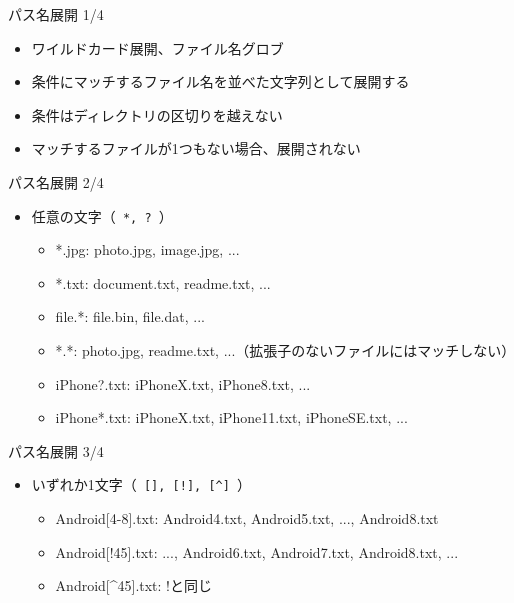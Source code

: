 \documentclass[12pt,aspectratio=169]{beamer}
\begin{document}
\begin{frame}{パス名展開 1/4}

  \begin{itemize}
    \item ワイルドカード展開、ファイル名グロブ
    \item 条件にマッチするファイル名を並べた文字列として展開する
    \item 条件はディレクトリの区切りを越えない
    \item マッチするファイルが1つもない場合、展開されない

  \end{itemize}

\end{frame}


\begin{frame}{パス名展開 2/4}

  \begin{itemize}
    \item 任意の文字（\texttt{ *, ? }）
      \begin{itemize}
        \item *.jpg: photo.jpg, image.jpg, ...
        \item *.txt: document.txt, readme.txt, ...
        \item file.*: file.bin, file.dat, ...
        \item *.*: photo.jpg, readme.txt, ...（拡張子のないファイルにはマッチしない）
        \item iPhone?.txt: iPhoneX.txt, iPhone8.txt, ...
        \item iPhone*.txt: iPhoneX.txt, iPhone11.txt, iPhoneSE.txt, ...
      \end{itemize}

  \end{itemize}

\end{frame}


\begin{frame}{パス名展開 3/4}

  \begin{itemize}
    \item いずれか1文字（\texttt{ [], [!], [\^{}] }）
      \begin{itemize}
        \item Android[4-8].txt: Android4.txt, Android5.txt, ..., Android8.txt
        \item Android[!45].txt: ..., Android6.txt, Android7.txt, Android8.txt, ...
        \item Android[\^{}45].txt: !と同じ
      \end{itemize}

  \end{itemize}

\end{frame}
\end{document}
